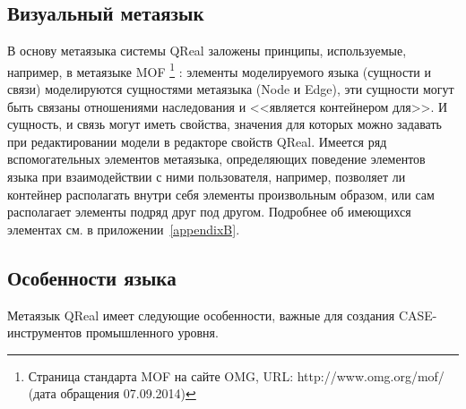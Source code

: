 \subsection{Визуальный метаязык}
В основу метаязыка системы QReal заложены принципы, используемые, например, в метаязыке MOF%
\footnote{Страница стандарта MOF на сайте OMG, URL: http://www.omg.org/mof/ (дата обращения 07.09.2014)}%
: элементы моделируемого языка (сущности и связи) моделируются сущностями метаязыка 
(Node и Edge), эти сущности могут быть связаны отношениями наследования и <<является контейнером для>>. 
И сущность, и связь могут иметь свойства, значения для которых можно задавать при 
редактировании модели в редакторе свойств QReal. Имеется ряд вспомогательных элементов 
метаязыка, определяющих поведение элементов языка при взаимодействии с ними пользователя, 
например, позволяет ли контейнер располагать внутри себя элементы произвольным образом, 
или сам располагает элементы подряд друг под другом. Подробнее об имеющихся элементах 
см. в приложении~\ref{appendixB}.

\subsection{Особенности языка}
Метаязык QReal имеет следующие особенности, важные для создания CASE-инструментов 
промышленного уровня.

